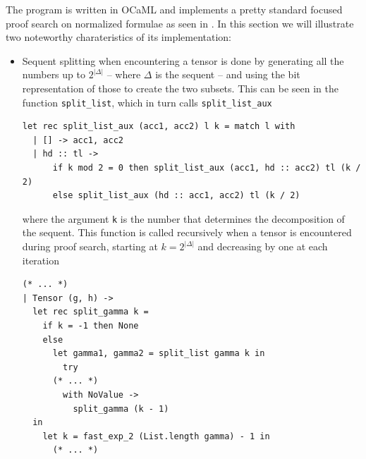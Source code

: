 \documentclass[a4paper, 12pt, tesi, english]{report}
\begin{document}
The program is written in OCaML and implements a pretty standard focused proof search on normalized formulae as seen in \cite{LiangMiller}.
In this section we will illustrate two noteworthy charateristics of its implementation:
\begin{itemize}
	\item Sequent splitting when encountering a tensor is done by generating all the numbers up to $2^{|\Delta|}$ -- where $\Delta$ is the sequent -- and using the bit representation of those to create the two subsets.
		This can be seen in the function \texttt{split\_list}, which in turn calls \texttt{split\_list\_aux}
		\begin{lstlisting}[language=caml]
let rec split_list_aux (acc1, acc2) l k = match l with
  | [] -> acc1, acc2
  | hd :: tl -> 
      if k mod 2 = 0 then split_list_aux (acc1, hd :: acc2) tl (k / 2)
      else split_list_aux (hd :: acc1, acc2) tl (k / 2)
		\end{lstlisting}
		where the argument \texttt{k} is the number that determines the decomposition of the sequent.
		This function is called recursively when a tensor is encountered during proof search, starting at $ k = 2^{|\Delta|}$ and decreasing by one at each iteration
		\begin{lstlisting}[language=caml]
(* ... *)
| Tensor (g, h) ->
  let rec split_gamma k = 
    if k = -1 then None
    else
      let gamma1, gamma2 = split_list gamma k in
        try
	  (* ... *)
        with NoValue ->
          split_gamma (k - 1) 
  in
    let k = fast_exp_2 (List.length gamma) - 1 in
      (* ... *)
		\end{lstlisting}


\end{itemize}
\end{document}
